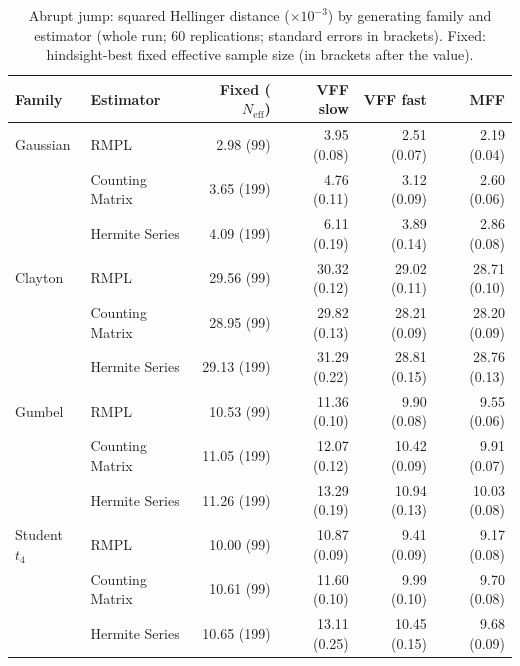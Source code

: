 \begin{table}[htbp]
\centering
\small
\caption{Abrupt jump: squared Hellinger distance ($\times10^{-3}$) by generating family and estimator (whole run; 60 replications; standard errors in brackets). Fixed: hindsight-best fixed effective sample size (in brackets after the value).}
\label{tab:app-strategy-h2-jump}
\begin{tabular}{llrrrr}
\toprule
Family & Estimator & Fixed ($N_{\mathrm{eff}}$) & VFF slow & VFF fast & MFF \\
\midrule
Gaussian & RMPL & 2.98 (99) & 3.95 (0.08) & 2.51 (0.07) & 2.19 (0.04) \\
 & Counting Matrix & 3.65 (199) & 4.76 (0.11) & 3.12 (0.09) & 2.60 (0.06) \\
 & Hermite Series & 4.09 (199) & 6.11 (0.19) & 3.89 (0.14) & 2.86 (0.08) \\
\addlinespace
Clayton & RMPL & 29.56 (99) & 30.32 (0.12) & 29.02 (0.11) & 28.71 (0.10) \\
 & Counting Matrix & 28.95 (99) & 29.82 (0.13) & 28.21 (0.09) & 28.20 (0.09) \\
 & Hermite Series & 29.13 (199) & 31.29 (0.22) & 28.81 (0.15) & 28.76 (0.13) \\
\addlinespace
Gumbel & RMPL & 10.53 (99) & 11.36 (0.10) & 9.90 (0.08) & 9.55 (0.06) \\
 & Counting Matrix & 11.05 (199) & 12.07 (0.12) & 10.42 (0.09) & 9.91 (0.07) \\
 & Hermite Series & 11.26 (199) & 13.29 (0.19) & 10.94 (0.13) & 10.03 (0.08) \\
\addlinespace
Student $t_4$ & RMPL & 10.00 (99) & 10.87 (0.09) & 9.41 (0.09) & 9.17 (0.08) \\
 & Counting Matrix & 10.61 (99) & 11.60 (0.10) & 9.99 (0.10) & 9.70 (0.08) \\
 & Hermite Series & 10.65 (199) & 13.11 (0.25) & 10.45 (0.15) & 9.68 (0.09) \\
\bottomrule
\end{tabular}
\end{table}

